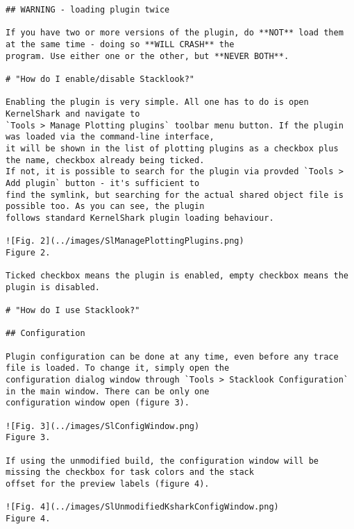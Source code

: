 \begin{verbatim}
## WARNING - loading plugin twice

If you have two or more versions of the plugin, do **NOT** load them at the same time - doing so **WILL CRASH** the 
program. Use either one or the other, but **NEVER BOTH**.

# "How do I enable/disable Stacklook?"

Enabling the plugin is very simple. All one has to do is open KernelShark and navigate to 
`Tools > Manage Plotting plugins` toolbar menu button. If the plugin was loaded via the command-line interface,
it will be shown in the list of plotting plugins as a checkbox plus the name, checkbox already being ticked.
If not, it is possible to search for the plugin via provded `Tools > Add plugin` button - it's sufficient to
find the symlink, but searching for the actual shared object file is possible too. As you can see, the plugin
follows standard KernelShark plugin loading behaviour.

![Fig. 2](../images/SlManagePlottingPlugins.png)
Figure 2.

Ticked checkbox means the plugin is enabled, empty checkbox means the plugin is disabled.

# "How do I use Stacklook?"

## Configuration

Plugin configuration can be done at any time, even before any trace file is loaded. To change it, simply open the 
configuration dialog window through `Tools > Stacklook Configuration` in the main window. There can be only one 
configuration window open (figure 3).

![Fig. 3](../images/SlConfigWindow.png)
Figure 3.

If using the unmodified build, the configuration window will be missing the checkbox for task colors and the stack
offset for the preview labels (figure 4).

![Fig. 4](../images/SlUnmodifiedKsharkConfigWindow.png)
Figure 4.


\end{verbatim}
